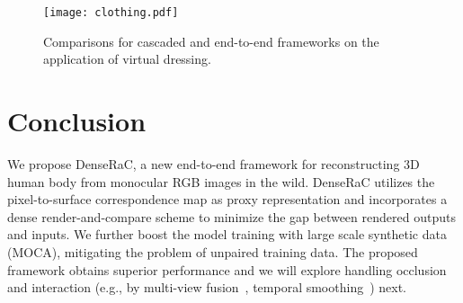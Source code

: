 \documentclass[10pt,twocolumn,letterpaper]{article}
\newcommand{\beforefigcaption}{\vspace{0mm}}
\newcommand{\afterfigcaption}{\vspace{0mm}}
\newcommand{\beforesection}{\vspace{0mm}}
\newcommand{\aftersection}{\vspace{0mm}}
\begin{document}
\begin{figure}[ptb]
\centering
\texttt{[image: clothing.pdf]}
\beforefigcaption
\caption{Comparisons for cascaded and end-to-end frameworks on the application of virtual dressing.}
\afterfigcaption
\label{fig:clothing}
\end{figure}

\beforesection
\section{Conclusion}
\aftersection

We propose DenseRaC, a new end-to-end framework for reconstructing 3D human body from monocular RGB images in the wild. DenseRaC utilizes the pixel-to-surface correspondence map as proxy representation and incorporates a dense render-and-compare scheme to minimize the gap between rendered outputs and inputs. We further boost the model training with large scale synthetic data (MOCA), mitigating the problem of unpaired training data. The proposed framework obtains superior performance and we will explore handling occlusion and interaction (e.g., by multi-view fusion~\cite{hangsceneparse18}, temporal smoothing~\cite{pavllovideopose3d19}) next.


{\small


}
\end{document}
